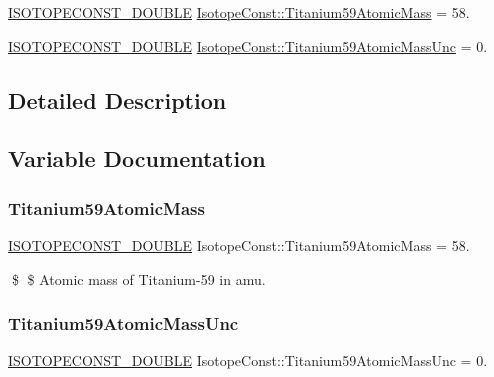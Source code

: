 \begin{DoxyCompactItemize}
\item 
\mbox{\hyperlink{group___isotope_const-_macros_ga8f45a7272ce02c0b4c65c44636ed719a}{I\+S\+O\+T\+O\+P\+E\+C\+O\+N\+S\+T\+\_\+\+D\+O\+U\+B\+LE}} \mbox{\hyperlink{group___isotope_const-_titanium-_ti59_gaad08e3e1a9454db7c1f52057c94d2ff8}{Isotope\+Const\+::\+Titanium59\+Atomic\+Mass}} = 58.
\item 
\mbox{\hyperlink{group___isotope_const-_macros_ga8f45a7272ce02c0b4c65c44636ed719a}{I\+S\+O\+T\+O\+P\+E\+C\+O\+N\+S\+T\+\_\+\+D\+O\+U\+B\+LE}} \mbox{\hyperlink{group___isotope_const-_titanium-_ti59_ga8130b7dffaec8db1b8acf69dce4dc56e}{Isotope\+Const\+::\+Titanium59\+Atomic\+Mass\+Unc}} = 0.
\end{DoxyCompactItemize}


\subsection{Detailed Description}


\subsection{Variable Documentation}
\mbox{\label{group___isotope_const-_titanium-_ti59_gaad08e3e1a9454db7c1f52057c94d2ff8}} 
\subsubsection{\texorpdfstring{Titanium59\+Atomic\+Mass}{Titanium59AtomicMass}}
{\footnotesize\ttfamily \mbox{\hyperlink{group___isotope_const-_macros_ga8f45a7272ce02c0b4c65c44636ed719a}{I\+S\+O\+T\+O\+P\+E\+C\+O\+N\+S\+T\+\_\+\+D\+O\+U\+B\+LE}} Isotope\+Const\+::\+Titanium59\+Atomic\+Mass = 58.}

\$ \$ Atomic mass of Titanium-\/59 in amu. \mbox{\label{group___isotope_const-_titanium-_ti59_ga8130b7dffaec8db1b8acf69dce4dc56e}} 
\subsubsection{\texorpdfstring{Titanium59\+Atomic\+Mass\+Unc}{Titanium59AtomicMassUnc}}
{\footnotesize\ttfamily \mbox{\hyperlink{group___isotope_const-_macros_ga8f45a7272ce02c0b4c65c44636ed719a}{I\+S\+O\+T\+O\+P\+E\+C\+O\+N\+S\+T\+\_\+\+D\+O\+U\+B\+LE}} Isotope\+Const\+::\+Titanium59\+Atomic\+Mass\+Unc = 0.}

